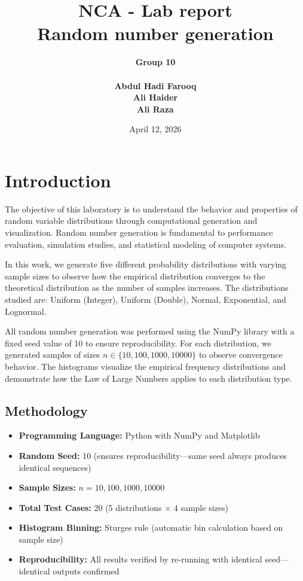 \documentclass[12pt]{article}
\title{NCA - Lab report \\

Random number generation
}
\author{\bf{Group 10} \\ \\
        Abdul Hadi Farooq \\
        Ali Haider \\
        Ali Raza \\
}
\date{April 12, 2026}
\begin{document}
\maketitle

\section{Introduction}

The objective of this laboratory is to understand the behavior and properties of random variable distributions through computational generation and visualization. Random number generation is fundamental to performance evaluation, simulation studies, and statistical modeling of computer systems.

In this work, we generate five different probability distributions with varying sample sizes to observe how the empirical distribution converges to the theoretical distribution as the number of samples increases. The distributions studied are: Uniform (Integer), Uniform (Double), Normal, Exponential, and Lognormal.

All random number generation was performed using the NumPy library with a fixed seed value of 10 to ensure reproducibility. For each distribution, we generated samples of sizes $n \in \{10, 100, 1000, 10000\}$ to observe convergence behavior. The histograms visualize the empirical frequency distributions and demonstrate how the Law of Large Numbers applies to each distribution type.

\subsection{Methodology}

\begin{itemize}
    \item \textbf{Programming Language:} Python with NumPy and Matplotlib
    \item \textbf{Random Seed:} 10 (ensures reproducibility---same seed always produces identical sequences)
    \item \textbf{Sample Sizes:} $n = 10, 100, 1000, 10000$
    \item \textbf{Total Test Cases:} 20 (5 distributions $\times$ 4 sample sizes)
    \item \textbf{Histogram Binning:} Sturges rule (automatic bin calculation based on sample size)
    \item \textbf{Reproducibility:} All results verified by re-running with identical seed---identical outputs confirmed
\end{itemize}
\end{document}
